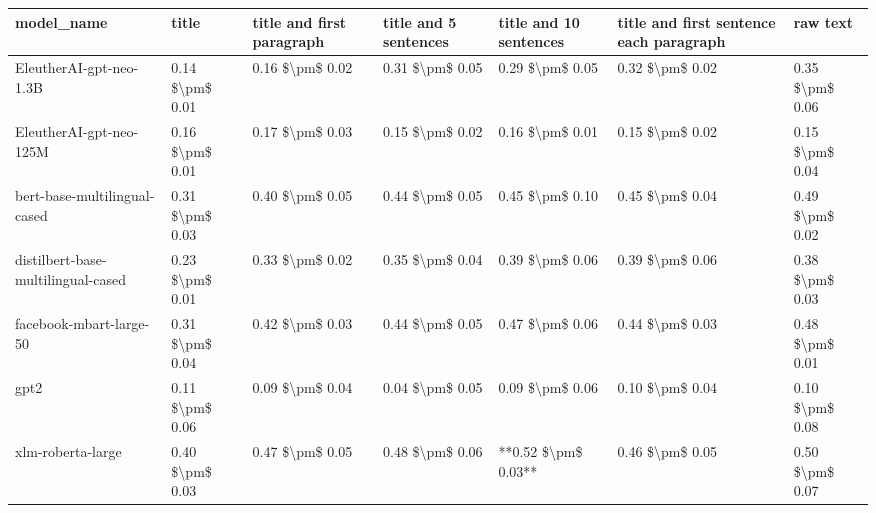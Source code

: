 \begin{tabular}{lllllll}
\toprule
                        model\_name &           title & title and first paragraph & title and 5 sentences & title and 10 sentences & title and first sentence each paragraph &        raw text \\
\midrule
           EleutherAI-gpt-neo-1.3B & 0.14 \$\textbackslash pm\$ 0.01 &           0.16 \$\textbackslash pm\$ 0.02 &       0.31 \$\textbackslash pm\$ 0.05 &        0.29 \$\textbackslash pm\$ 0.05 &                         0.32 \$\textbackslash pm\$ 0.02 & 0.35 \$\textbackslash pm\$ 0.06 \\
           EleutherAI-gpt-neo-125M & 0.16 \$\textbackslash pm\$ 0.01 &           0.17 \$\textbackslash pm\$ 0.03 &       0.15 \$\textbackslash pm\$ 0.02 &        0.16 \$\textbackslash pm\$ 0.01 &                         0.15 \$\textbackslash pm\$ 0.02 & 0.15 \$\textbackslash pm\$ 0.04 \\
      bert-base-multilingual-cased & 0.31 \$\textbackslash pm\$ 0.03 &           0.40 \$\textbackslash pm\$ 0.05 &       0.44 \$\textbackslash pm\$ 0.05 &        0.45 \$\textbackslash pm\$ 0.10 &                         0.45 \$\textbackslash pm\$ 0.04 & 0.49 \$\textbackslash pm\$ 0.02 \\
distilbert-base-multilingual-cased & 0.23 \$\textbackslash pm\$ 0.01 &           0.33 \$\textbackslash pm\$ 0.02 &       0.35 \$\textbackslash pm\$ 0.04 &        0.39 \$\textbackslash pm\$ 0.06 &                         0.39 \$\textbackslash pm\$ 0.06 & 0.38 \$\textbackslash pm\$ 0.03 \\
           facebook-mbart-large-50 & 0.31 \$\textbackslash pm\$ 0.04 &           0.42 \$\textbackslash pm\$ 0.03 &       0.44 \$\textbackslash pm\$ 0.05 &        0.47 \$\textbackslash pm\$ 0.06 &                         0.44 \$\textbackslash pm\$ 0.03 & 0.48 \$\textbackslash pm\$ 0.01 \\
                              gpt2 & 0.11 \$\textbackslash pm\$ 0.06 &           0.09 \$\textbackslash pm\$ 0.04 &       0.04 \$\textbackslash pm\$ 0.05 &        0.09 \$\textbackslash pm\$ 0.06 &                         0.10 \$\textbackslash pm\$ 0.04 & 0.10 \$\textbackslash pm\$ 0.08 \\
                 xlm-roberta-large & 0.40 \$\textbackslash pm\$ 0.03 &           0.47 \$\textbackslash pm\$ 0.05 &       0.48 \$\textbackslash pm\$ 0.06 &    **0.52 \$\textbackslash pm\$ 0.03** &                         0.46 \$\textbackslash pm\$ 0.05 & 0.50 \$\textbackslash pm\$ 0.07 \\
\bottomrule
\end{tabular}

